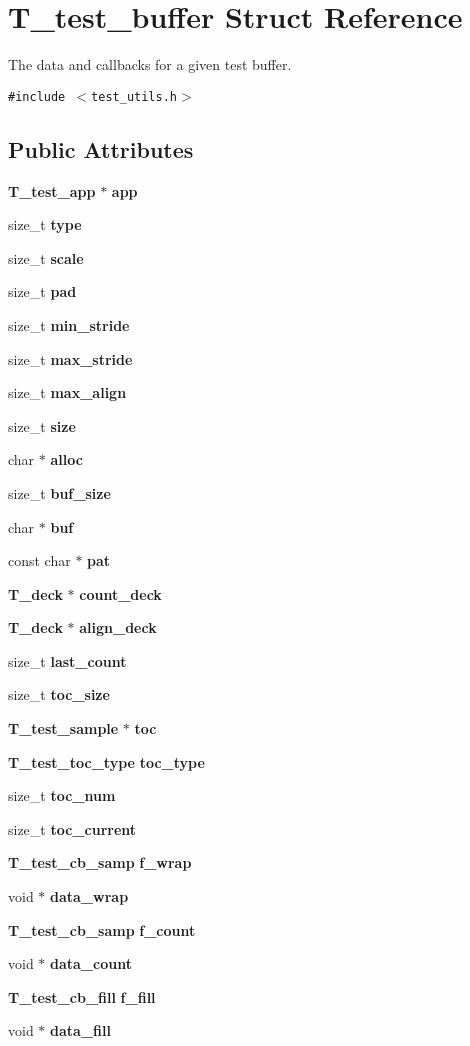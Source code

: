 \section{T\_\-test\_\-buffer Struct Reference}
\label{structT__test__buffer}
The data and callbacks for a given test buffer. 


{\tt \#include $<$test\_\-utils.h$>$}

\subsection*{Public Attributes}
\begin{CompactItemize}
\item 
{\bf T\_\-test\_\-app} $\ast$ {\bf app}
\item 
size\_\-t {\bf type}
\item 
size\_\-t {\bf scale}
\item 
size\_\-t {\bf pad}
\item 
size\_\-t {\bf min\_\-stride}
\item 
size\_\-t {\bf max\_\-stride}
\item 
size\_\-t {\bf max\_\-align}
\item 
size\_\-t {\bf size}
\item 
char $\ast$ {\bf alloc}
\item 
size\_\-t {\bf buf\_\-size}
\item 
char $\ast$ {\bf buf}
\item 
const char $\ast$ {\bf pat}
\item 
{\bf T\_\-deck} $\ast$ {\bf count\_\-deck}
\item 
{\bf T\_\-deck} $\ast$ {\bf align\_\-deck}
\item 
size\_\-t {\bf last\_\-count}
\item 
size\_\-t {\bf toc\_\-size}
\item 
{\bf T\_\-test\_\-sample} $\ast$ {\bf toc}
\item 
{\bf T\_\-test\_\-toc\_\-type} {\bf toc\_\-type}
\item 
size\_\-t {\bf toc\_\-num}
\item 
size\_\-t {\bf toc\_\-current}
\item 
{\bf T\_\-test\_\-cb\_\-samp} {\bf f\_\-wrap}
\item 
void $\ast$ {\bf data\_\-wrap}
\item 
{\bf T\_\-test\_\-cb\_\-samp} {\bf f\_\-count}
\item 
void $\ast$ {\bf data\_\-count}
\item 
{\bf T\_\-test\_\-cb\_\-fill} {\bf f\_\-fill}
\item 
void $\ast$ {\bf data\_\-fill}
\end{CompactItemize}


